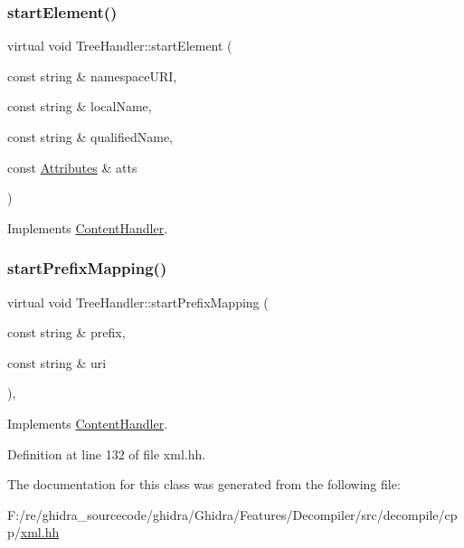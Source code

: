 \mbox{\label{class_tree_handler_a6bd0480fcc5176e1ec06148aa7d2bff3}} 
\subsubsection{\texorpdfstring{startElement()}{startElement()}}
{\footnotesize\ttfamily virtual void Tree\+Handler\+::start\+Element (\begin{DoxyParamCaption}\item[{const string \&}]{namespace\+U\+RI,  }\item[{const string \&}]{local\+Name,  }\item[{const string \&}]{qualified\+Name,  }\item[{const \mbox{\hyperlink{class_attributes}{Attributes}} \&}]{atts }\end{DoxyParamCaption})\hspace{0.3cm}{\ttfamily [virtual]}}



Implements \mbox{\hyperlink{class_content_handler_a77a58836917fd32b56230151f6d6966e}{Content\+Handler}}.

\mbox{\label{class_tree_handler_a086404533a2eca59f3efddbcc0e35c06}} 
\subsubsection{\texorpdfstring{startPrefixMapping()}{startPrefixMapping()}}
{\footnotesize\ttfamily virtual void Tree\+Handler\+::start\+Prefix\+Mapping (\begin{DoxyParamCaption}\item[{const string \&}]{prefix,  }\item[{const string \&}]{uri }\end{DoxyParamCaption})\hspace{0.3cm}{\ttfamily [inline]}, {\ttfamily [virtual]}}



Implements \mbox{\hyperlink{class_content_handler_ac6e945ce50f644015db0d3045465c2ca}{Content\+Handler}}.



Definition at line 132 of file xml.\+hh.



The documentation for this class was generated from the following file\+:\begin{DoxyCompactItemize}
\item 
F\+:/re/ghidra\+\_\+sourcecode/ghidra/\+Ghidra/\+Features/\+Decompiler/src/decompile/cpp/\mbox{\hyperlink{xml_8hh}{xml.\+hh}}\end{DoxyCompactItemize}
